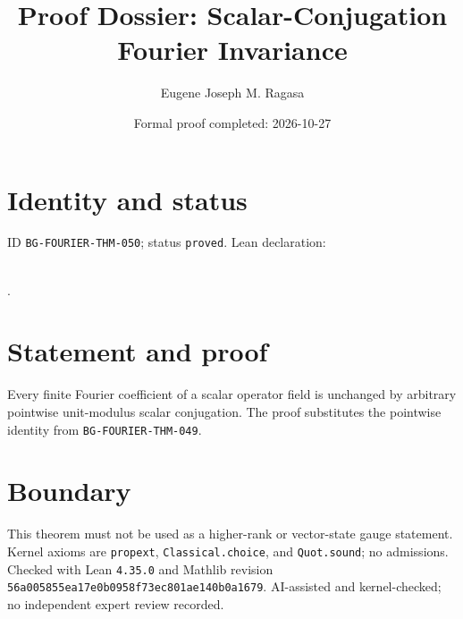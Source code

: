 \documentclass[11pt]{article}
\title{Proof Dossier: Scalar-Conjugation Fourier Invariance}\author{Eugene Joseph M. Ragasa}\date{Formal proof completed: 2026-10-27}
\begin{document}
\maketitle
\section{Identity and status}
ID \texttt{BG-FOURIER-THM-050}; status \texttt{proved}. Lean declaration:
\par{}\\
{\tiny{}}.
\section{Statement and proof}
Every finite Fourier coefficient of a scalar operator field is unchanged by arbitrary
pointwise unit-modulus scalar conjugation. The proof substitutes the pointwise identity
from \texttt{BG-FOURIER-THM-049}.
\section{Boundary}
This theorem must not be used as a higher-rank or vector-state gauge statement. Kernel
axioms are \texttt{propext}, \texttt{Classical.choice}, and \texttt{Quot.sound}; no
admissions. Checked with Lean \texttt{4.35.0} and Mathlib revision
\texttt{56a005855ea17e0b0958f73ec801ae140b0a1679}. AI-assisted and kernel-checked;
no independent expert review recorded.
\end{document}
